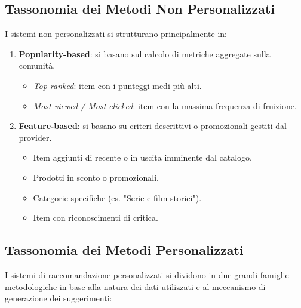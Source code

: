 \subsection{Tassonomia dei Metodi Non Personalizzati}
I sistemi non personalizzati si strutturano principalmente in:
\begin{enumerate}
    \item \textbf{Popularity-based}: si basano sul calcolo di metriche aggregate sulla comunità.
    \begin{itemize}
        \item \textit{Top-ranked}: item con i punteggi medi più alti.
        \item \textit{Most viewed / Most clicked}: item con la massima frequenza di fruizione.
    \end{itemize}
    \item \textbf{Feature-based}: si basano su criteri descrittivi o promozionali gestiti dal provider.
    \begin{itemize}
        \item Item aggiunti di recente o in uscita imminente dal catalogo.
        \item Prodotti in sconto o promozionali.
        \item Categorie specifiche (es. "Serie e film storici").
        \item Item con riconoscimenti di critica.
    \end{itemize}
\end{enumerate}

\subsection{Tassonomia dei Metodi Personalizzati}

I sistemi di raccomandazione personalizzati si dividono in due grandi famiglie metodologiche in base alla natura dei dati utilizzati e al meccanismo di generazione dei suggerimenti:

